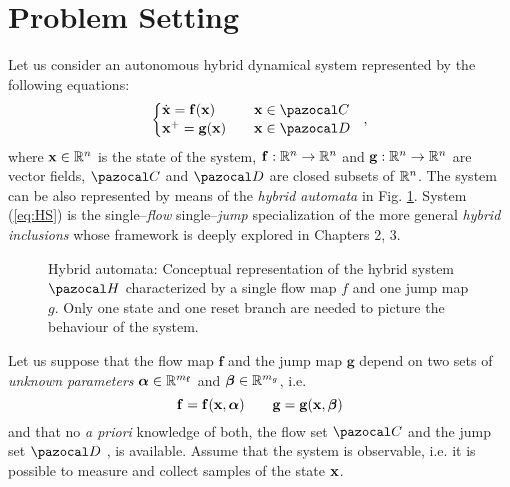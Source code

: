 \section{Problem Setting}\label{ProblemS}
Let us consider an autonomous hybrid dynamical system represented {by the following equations:}
%
\begin{equation}\label{eq:HS}
    \left\{ 
        \begin{matrix*}[l]\vspace{1pt}
            \dot{\x} = \mathbf{\mathbf{f}}(\x) &&\x\in\C\\
            \x^+ = \mathbf{g}(\x)&&\x\in\D
        \end{matrix*}
    \right.~~,
\end{equation}
%
where $\mathbf{x}\in\mathbb{R}^n$ is the state of the system, $\mathbf{\mathbf{f}}:\mathbb{R}^n\rightarrow\mathbb{R}^n$ and $\mathbf{g}:\mathbb{R}^n\rightarrow\mathbb{R}^n$ are vector fields, $\C$ and $\D$ are closed subsets of $\mathbb{R}^n$.
The system can be also represented by means of the \textit{hybrid automata} in Fig. \ref{fig:HA}.      
System (\ref{eq:HS}) is the single--\textit{flow} single--\textit{jump} specialization of the more general \textit{hybrid inclusions} whose framework is deeply explored in Chapters 2, 3.%
%
\begin{figure}[!h]
	\centering
	\caption[Hybrid automata representiation of the system.]{Hybrid automata: Conceptual representation of the hybrid system $\Ha$ characterized by a single flow map $f$ and one jump map $g$. Only one state and one reset branch are needed to picture the behaviour of the system.}
	\label{fig:HA}
\end{figure}
%

Let us suppose that the flow map $\mathbf{\mathbf{f}}$ and the jump map $\mathbf{g}$ depend on two sets of \textit{unknown parameters} $\bm{\bm{\alpha}}\in\mathbb{R}^{m_\mathbf{f}}$ and $\bm{\bm{\beta}}\in\mathbb{R}^{m_g}$, i.e.
\[\mathbf{\mathbf{f}} = \mathbf{\mathbf{f}}(\mathbf{x},\bm{\alpha})\qquad \mathbf{g} = \mathbf{g}(\mathbf{x},\bm{\beta})\]
and that no \textit{a priori} knowledge of both, the flow set $\C$ and the jump set $\D$ , is available.
Assume that the system is observable, i.e. it is possible to measure and collect samples of the state $\mathbf{x}$.

